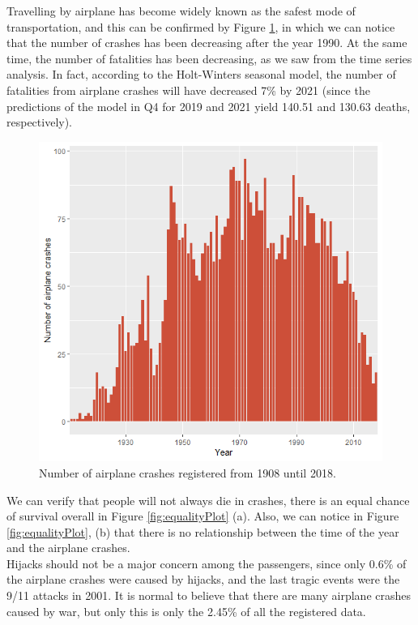 \documentclass[12pt]{article}
\begin{document}
Travelling by airplane has become widely known as the safest mode of transportation, and this can be confirmed by Figure \ref{fig:numCrash}, in which we can notice that the number of crashes has been decreasing after the year 1990. At the same time, the number of fatalities has been decreasing, as we saw from the time series analysis. In fact, according to the Holt-Winters seasonal model, the number of fatalities from airplane crashes will have decreased 7\% by 2021 (since the predictions of the model in Q4 for 2019 and 2021 yield 140.51 and 130.63 deaths, respectively).\\

\begin{figure}[h]
	\centering
	\includegraphics[width=0.8\linewidth]{numCrash}
	\caption{Number of airplane crashes registered from 1908 until 2018.}
	\label{fig:numCrash}
\end{figure}

We can verify that people will not always die in crashes, there is an equal chance of survival overall in Figure \ref{fig:equalityPlot} (a). Also, we can notice in Figure \ref{fig:equalityPlot}, (b) that there is no relationship between the time of the year and the airplane crashes. \\

Hijacks should not be a major concern among the passengers, since only 0.6\% of the airplane crashes were caused by hijacks, and the last tragic events were the 9/11 attacks in 2001. It is normal to believe that there are many airplane crashes caused by war, but only this is only the 2.45\% of all the registered data. 
\end{document}
